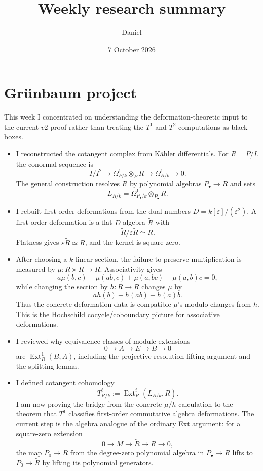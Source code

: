 \documentclass[11pt]{article}
\title{Weekly research summary}
\author{Daniel}
\date{7 October 2026}
\begin{document}
\maketitle
\section*{Grünbaum project}
This week I concentrated on understanding the deformation-theoretic input to the current \(v2\) proof rather than treating the \(T^1\) and \(T^2\) computations as black boxes.

\begin{itemize}
\item I reconstructed the cotangent complex from Kähler differentials. For \(R=P/I\), the conormal sequence is
$$
I/I^2\longrightarrow\Omega^1_{P/k}\otimes_PR
\longrightarrow\Omega^1_{R/k}\longrightarrow0.
$$
The general construction resolves \(R\) by polynomial algebras \(P_\bullet\to R\) and sets
$$
L_{R/k}=\Omega^1_{P_\bullet/k}\otimes_{P_\bullet}R.
$$

\item I rebuilt first-order deformations from the dual numbers \(D=k[\varepsilon]/(\varepsilon^2)\). A first-order deformation is a flat \(D\)-algebra \(\widetilde R\) with
$$
\widetilde R/\varepsilon\widetilde R\simeq R.
$$
Flatness gives \(\varepsilon\widetilde R\simeq R\), and the kernel is square-zero.

\item After choosing a \(k\)-linear section, the failure to preserve multiplication is measured by \(\mu:R\times R\to R\). Associativity gives
$$
a\mu(b,c)-\mu(ab,c)+\mu(a,bc)-\mu(a,b)c=0,
$$
while changing the section by \(h:R\to R\) changes \(\mu\) by
$$
a h(b)-h(ab)+h(a)b.
$$
Thus the concrete deformation data is compatible \(\mu\)'s modulo changes from \(h\). This is the Hochschild cocycle/coboundary picture for associative deformations.

\item I reviewed why equivalence classes of module extensions
$$
0\longrightarrow A\longrightarrow E\longrightarrow B\longrightarrow0
$$
are \(\operatorname{Ext}^1_R(B,A)\), including the projective-resolution lifting argument and the splitting lemma.

\item I defined cotangent cohomology
$$
T^i_{R/k}:=\operatorname{Ext}^i_R(L_{R/k},R).
$$
I am now proving the bridge from the concrete \(\mu/h\) calculation to the theorem that \(T^1\) classifies first-order commutative algebra deformations. The current step is the algebra analogue of the ordinary Ext argument: for a square-zero extension
$$
0\longrightarrow M\longrightarrow\widetilde R\longrightarrow R\longrightarrow0,
$$
the map \(P_0\to R\) from the degree-zero polynomial algebra in \(P_\bullet\to R\) lifts to \(P_0\to\widetilde R\) by lifting its polynomial generators.
\end{itemize}
\end{document}
